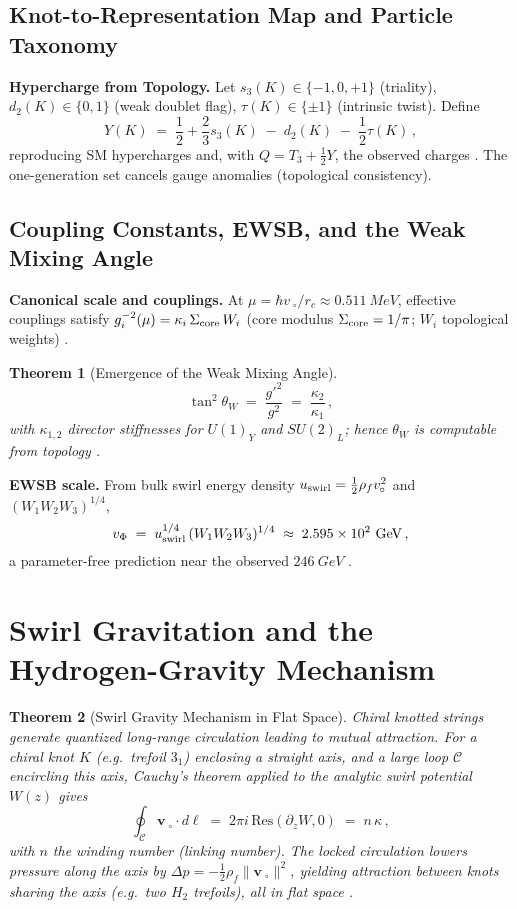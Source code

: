 \documentclass[11pt]{article}
\newtheorem{theorem}{Theorem}[section]
\begin{document}
	\subsection{Knot-to-Representation Map and Particle Taxonomy}

	\textbf{Hypercharge from Topology.} Let $s_3(K)\in\{-1,0,+1\}$ (triality), $d_2(K)\in\{0,1\}$ (weak doublet flag), $\tau(K)\in\{\pm1\}$ (intrinsic twist). Define
	\[
		Y(K) \;=\; \frac{1}{2} + \frac{2}{3}s_3(K) \;-\; d_2(K) \;-\; \frac{1}{2}\tau(K)\,,
	\]
	reproducing SM hypercharges and, with $Q=T_3+\tfrac{1}{2}Y$, the observed charges \cite{Weinberg1967,PeskinSchroeder1995,Iskandarani2025Canon034}. The one-generation set cancels gauge anomalies (topological consistency).

	\subsection{Coupling Constants, EWSB, and the Weak Mixing Angle}

	\textbf{Canonical scale and couplings.} At $\mu=\hbar v_{\!\!\;\circ}/r_c\approx 0.511~\si{MeV}$, effective couplings satisfy $g_i^{-2}(\mu)=\kappa_i\,\Sigma_{\rm core}\,W_i$ (core modulus $\Sigma_{\rm core}=1/\pi$; $W_i$ topological weights) \cite{Iskandarani2025Canon034}.

	\begin{theorem}[Emergence of the Weak Mixing Angle]
		\[
			\tan^2\theta_W \;=\; \frac{g'^2}{g^2} \;=\; \frac{\kappa_2}{\kappa_1}\,,
		\]
		with $\kappa_{1,2}$ director stiffnesses for $U(1)_Y$ and $SU(2)_L$; hence $\theta_W$ is computable from topology \cite{Weinberg1967,PeskinSchroeder1995,Iskandarani2025Canon034}.
	\end{theorem}

	\textbf{EWSB scale.} From bulk swirl energy density $u_{\rm swirl}=\tfrac12\rho_f v_{\!\!\;\circ}^2$ and $(W_1W_2W_3)^{1/4}$,
	\[
		v_\Phi \;=\; u_{\rm swirl}^{1/4}\,(W_1 W_2 W_3)^{1/4} \;\approx\; 2.595\times10^2~\si{GeV}\,,
	\]
	a parameter-free prediction near the observed $246~\si{GeV}$ \cite{Iskandarani2025Canon034}.

	\section{Swirl Gravitation and the Hydrogen-Gravity Mechanism}

	\begin{theorem}[Swirl Gravity Mechanism in Flat Space]
		Chiral knotted strings generate quantized long-range circulation leading to mutual attraction. For a chiral knot $K$ (e.g.\ trefoil $3_1$) enclosing a straight axis, and a large loop $\mathcal{C}$ encircling this axis, Cauchy’s theorem applied to the analytic swirl potential $W(z)$ gives
		\[
			\oint_{\mathcal{C}} \mathbf{v}_{\!\!\;\circ}\cdot d\boldsymbol{\ell} \;=\; 2\pi i\,\mathrm{Res}(\partial_z W,0) \;=\; n\,\kappa\,,
		\]
		with $n$ the winding number (linking number). The locked circulation lowers pressure along the axis by $\Delta p = -\tfrac{1}{2}\rho_f \|\mathbf{v}_{\!\!\;\circ}\|^2$, yielding attraction between knots sharing the axis (e.g.\ two $H_2$ trefoils), all in flat space \cite{Iskandarani2025Hydrogen}.
	\end{theorem}
\end{document}
